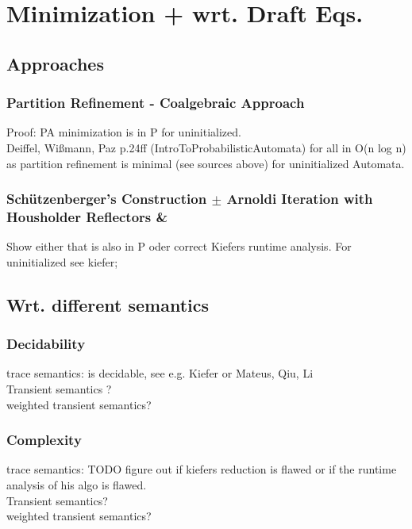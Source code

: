     \section{Minimization + wrt. Draft Eqs.}
        \begin{definition}
         
        \end{definition}
        \subsection{Approaches}
            \subsubsection{Partition Refinement - Coalgebraic Approach}
            Proof: PA minimization is in P for uninitialized. \\
            Deiffel, Wißmann, Paz p.24ff (IntroToProbabilisticAutomata)
            for all in O(n log n) as partition refinement is minimal (see sources above) for uninitialized Automata. \\
        
            \subsubsection{Schützenberger's Construction $\pm$ Arnoldi Iteration with Housholder Reflectors \& }
            Show either that is also in P oder correct Kiefers runtime analysis.
            For uninitialized see kiefer; 
            
        \subsection{Wrt. different semantics}
            \subsubsection{Decidability}
            trace semantics: is decidable, see e.g. Kiefer or Mateus, Qiu, Li \\
            Transient semantics ? \\
            weighted transient semantics? \\
            
            \subsubsection{Complexity}
            trace semantics: TODO figure out if kiefers reduction is flawed or if the runtime analysis of his algo is flawed. \\
            Transient semantics? \\
            weighted transient semantics? \\
            
    
